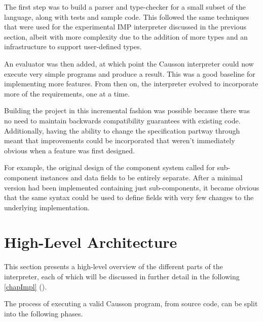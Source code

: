 \documentclass[11pt]{report}
\begin{document}
The first step was to build a parser and type-checker for a small subset of the language, along with tests and sample code. This followed the same techniques that were used for the experimental IMP interpreter discussed in the previous section, albeit with more complexity due to the addition of more types and an infrastructure to support user-defined types.

An evaluator was then added, at which point the Causson interpreter could now execute very simple programs and produce a result. This was a good baseline for implementing more features. From then on, the interpreter evolved to incorporate more of the requirements, one at a time.

Building the project in this incremental fashion was possible because there was no need to maintain backwards compatibility guarantees with existing code. Additionally, having the ability to change the specification partway through meant that improvements could be incorporated that weren't immediately obvious when a feature was first designed.

For example, the original design of the component system called for sub-component instances and data fields to be entirely separate. After a minimal version had been implemented containing just sub-components, it became obvious that the same syntax could be used to define fields with very few changes to the underlying implementation.

\section{High-Level Architecture}

This section presents a high-level overview of the different parts of the interpreter, each of which will be discussed in further detail in the following \cref{chapImpl} (\emph{}).

The process of executing a valid Causson program, from source code, can be split into the following phases.
\end{document}
